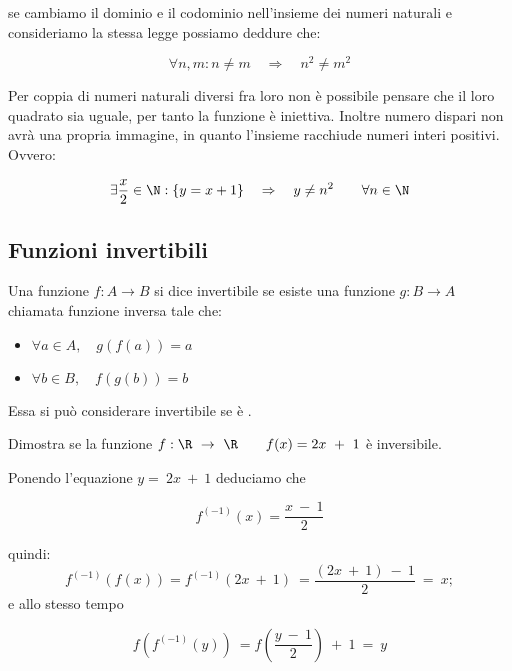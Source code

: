 \documentclass[../appunti.tex]{subfiles}
\begin{document}
\begin{dimo}
  se cambiamo il dominio e il codominio nell'insieme dei numeri naturali e consideriamo la stessa legge possiamo deddure che:

\begin{equation}
  \forall n,m : n \ne m \quad \Rightarrow \quad n^2 \ne m^2
\end{equation}

\vspace{3.5mm}
Per  coppia di numeri naturali diversi fra loro non è possibile pensare che il loro quadrato sia uguale, per tanto la funzione è iniettiva. 
\vspace{2.5mm}
Inoltre  numero dispari non avrà una propria immagine, in quanto l'insieme racchiude  numeri interi positivi. Ovvero:

\begin{equation}
  \exists \frac{x}{2} \in \N: \{y = x + 1\} \quad
  \Rightarrow \quad y \ne n^2 \qquad \forall n\in \N
\end{equation}

\end{dimo}


\subsection{Funzioni invertibili}
\begin{defn} Una funzione $f:A\rightarrow B$ si dice invertibile se esiste una funzione $g: B \rightarrow A$ chiamata funzione inversa tale che:
\begin{itemize}
  \item $\forall a\in A, \quad g(f(a))=a$
  \item $\forall b\in B, \quad f(g(b))=b$
\end{itemize}
Essa si può considerare invertibile se è .
\end{defn}

\begin{eser}
  Dimostra se la funzione $f: \R \ \rightarrow \ \R \qquad f(x) = 2x\ +\ 1$ è inversibile.
\end{eser}

\begin{dimo}
Ponendo l'equazione $ y =\ 2x\ +\ 1$ deduciamo che

	\begin{equation}
  		f^{(-1)}(x) = \frac{x\ -\ 1}{2}
	\end{equation}

\vspace{1.5mm}
quindi:
\begin{equation}
  f^{(-1)}(f(x))= f^{(-1)}(2x\ +\ 1)\ = \frac{(2x\ +\ 1)\ -\ 1}{2}\ =\ x;
\end{equation}
\vspace{1.5mm}
e allo stesso tempo

\vspace{1.5mm}
\begin{equation}
f(f^{(-1)}(y))\ = f(\frac{y\ -\ 1}{2})\ +\ 1\ =\ y
\end{equation}
\end{dimo}
\end{document}
